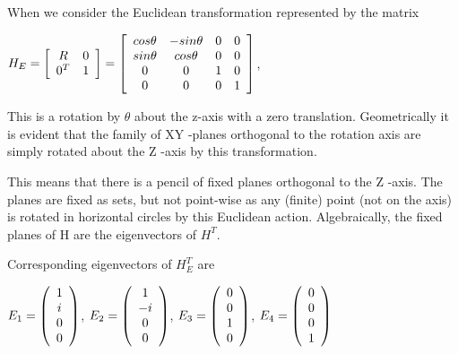 \documentclass[]{article}
\begin{document}
When we consider the Euclidean transformation represented by the matrix 

\vspace{0.5em}

\centerline {
	$H_E = \left[ {\begin{array}{*{20}c}
		R & 0 \\
		0^T & 1   
		\end{array} } \right] =  \left[ {\begin{array}{*{20}c}
		cos \theta & -sin \theta & 0 & 0 \\
		sin \theta & cos \theta  & 0 & 0 \\ 
		0 & 0 & 1 & 0 \\ 
		0 & 0 & 0 & 1   
		\end{array} } \right] $,
}

\vspace{0.5em}

This is a rotation by $ \theta $ about the z-axis with a zero translation. Geometrically it is evident that the family of XY -planes orthogonal to the rotation axis are simply rotated about the Z -axis by this transformation.

This means that there is a pencil of fixed planes orthogonal to the Z -axis. The planes
are fixed as sets, but not point-wise as any (finite) point (not on the axis) is rotated in horizontal circles by this Euclidean action. Algebraically, the fixed planes of H are the eigenvectors of $H^T$.

Corresponding eigenvectors of $H_E^T$ are 

\vspace{0.5em}

\centerline {
	$E_1 = \left( {\begin{array}{*{20}c}
		1 \\
		i \\ 
		0 \\
		0   
		\end{array} } \right)$, $E_2 = \left( {\begin{array}{*{20}c}
		1 \\
		-i \\ 
		0 \\
		0   
		\end{array} } \right)$, 	$E_3 = \left( {\begin{array}{*{20}c}
		0 \\
		0 \\ 
		1 \\
		0   
		\end{array} } \right)$, 	$E_4 = \left( {\begin{array}{*{20}c}
		0 \\
		0 \\ 
		0 \\
		1   
		\end{array} } \right)$
}
\end{document}

